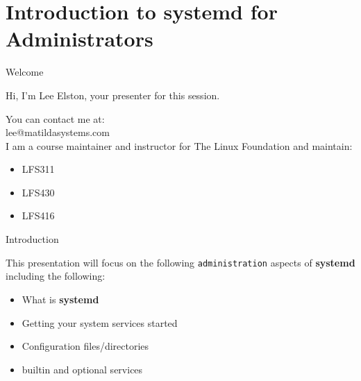\section{Introduction to systemd for Administrators}


\begin{frame}
	{Welcome}

	Hi, I'm Lee Elston, your presenter for this session.

	You can contact me at: \\
	lee@matildasystems.com \\

	I am a course maintainer and instructor for The Linux Foundation
	and maintain: 

	\begin{itemize}

	\item LFS311
	\item LFS430
	\item LFS416
	
	\end{itemize}

\end{frame}

\cprotect\note{

	}


\begin{frame}
   {Introduction}

	This presentation will focus on the following \texttt{administration}
	aspects of \textbf{systemd} including the following: 
   \begin{itemize}
	\item What is \textbf{systemd}
	\item Getting your system services started
	\item Configuration files/directories 
	\item builtin and optional services 
    \end{itemize}

\end{frame}

\cprotect\note{


}

